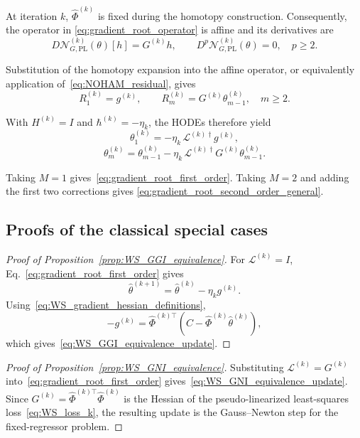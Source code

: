 \documentclass[11pt]{article}
\theoremstyle{remark}
\begin{document}
At iteration $k$, $\hat\Phi^{(k)}$ is fixed during the homotopy
construction. Consequently, the operator in
\eqref{eq:gradient_root_operator} is affine and its derivatives are
\begin{equation}
\label{eq:gradient_root_derivatives}
    D\mathcal{N}_{G,\mathrm{PL}}^{(k)}(\theta)[h]
    =
    G^{(k)}h,
    \qquad
    D^p\mathcal{N}_{G,\mathrm{PL}}^{(k)}(\theta)=0,
    \quad p\geq 2.
\end{equation}

Substitution of the homotopy expansion into the affine operator, or
equivalently application of~\eqref{eq:NOHAM_residual}, gives
\begin{equation}
\label{eq:gradient_root_residuals}
    R_1^{(k)}
    =
    g^{(k)},
    \qquad
    R_m^{(k)}
    =
    G^{(k)}\theta_{m-1}^{(k)},
    \quad m\geq 2.
\end{equation}

With $H^{(k)}=I$ and $\hbar^{(k)}=-\eta_k$, the HODEs therefore yield
\begin{equation}
\label{eq:gradient_root_theta1_general}
    \theta_1^{(k)}
    =
    -\eta_k\,\mathcal{L}^{(k)\dagger}g^{(k)},
\end{equation}
\begin{equation}
\label{eq:gradient_root_thetam_general}
    \theta_m^{(k)}
    =
    \theta_{m-1}^{(k)}
    -
    \eta_k\,\mathcal{L}^{(k)\dagger}
    G^{(k)}\theta_{m-1}^{(k)}.
\end{equation}

Taking $M=1$ gives~\eqref{eq:gradient_root_first_order}. Taking
$M=2$ and adding the first two corrections gives
\eqref{eq:gradient_root_second_order_general}.

\subsection{Proofs of the classical special cases}

\begin{proof}[Proof of Proposition~\ref{prop:WS_GGI_equivalence}]
For $\mathcal{L}^{(k)}=I$, Eq.~\eqref{eq:gradient_root_first_order} gives
\[
    \hat{\theta}^{(k+1)}
    =
    \hat{\theta}^{(k)}
    -
    \eta_k g^{(k)}.
\]
Using~\eqref{eq:WS_gradient_hessian_definitions},
\[
    -g^{(k)}
    =
    \hat{\Phi}^{(k)\top}
    \left(
    C-\hat{\Phi}^{(k)}\hat{\theta}^{(k)}
    \right),
\]
which gives~\eqref{eq:WS_GGI_equivalence_update}.
\end{proof}
\begin{proof}[Proof of Proposition~\ref{prop:WS_GNI_equivalence}]
Substituting $\mathcal{L}^{(k)}=G^{(k)}$ into~\eqref{eq:gradient_root_first_order} gives~\eqref{eq:WS_GNI_equivalence_update}. Since $G^{(k)}=\hat{\Phi}^{(k)\top}\hat{\Phi}^{(k)}$ is the Hessian of the pseudo-linearized least-squares loss~\eqref{eq:WS_loss_k}, the resulting update is the Gauss--Newton step for the fixed-regressor problem.
\end{proof}
\end{document}

